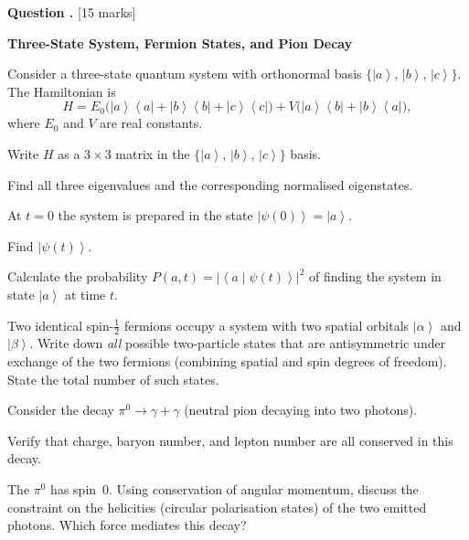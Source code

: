 \documentclass[12pt,a4paper]{article}
\newcounter{questioncounter}
\newcommand{\question}[1]{%
  \stepcounter{questioncounter}%
  \vspace{0.5cm}%
  \noindent\textbf{Question \thequestioncounter.} \hfill [#1 marks]%
  \vspace{0.2cm}%
  \par%
}
\renewcommand{\ket}[1]{\left|#1\right\rangle}
\renewcommand{\braket}[2]{\left\langle #1\middle|#2\right\rangle}
\renewcommand{\ketbra}[2]{\left|#1\right\rangle\!\left\langle #2\right|}
\begin{document}
\newpage

\question{15}

\noindent\textbf{Three-State System, Fermion States, and Pion Decay}

\begin{parts}
\item Consider a three-state quantum system with orthonormal basis $\{\ket{a},\,\ket{b},\,\ket{c}\}$. The Hamiltonian is
\[
H = E_0\bigl(\ketbra{a}{a} + \ketbra{b}{b} + \ketbra{c}{c}\bigr) + V\bigl(\ketbra{a}{b} + \ketbra{b}{a}\bigr),
\]
where $E_0$ and $V$ are real constants.
\begin{parts}
\item Write $H$ as a $3\times 3$ matrix in the $\{\ket{a},\,\ket{b},\,\ket{c}\}$ basis. 
\item Find all three eigenvalues and the corresponding normalised eigenstates. 
\end{parts}

\item At $t = 0$ the system is prepared in the state $\ket{\psi(0)} = \ket{a}$.
\begin{parts}
\item Find $\ket{\psi(t)}$. 
\item Calculate the probability $P(a,t) = |\braket{a}{\psi(t)}|^2$ of finding the system in state $\ket{a}$ at time $t$. 
\end{parts}

\item Two identical spin-$\frac{1}{2}$ fermions occupy a system with two spatial orbitals $\ket{\alpha}$ and $\ket{\beta}$. Write down \emph{all} possible two-particle states that are antisymmetric under exchange of the two fermions (combining spatial and spin degrees of freedom). State the total number of such states. 

\item Consider the decay $\pi^0 \to \gamma + \gamma$ (neutral pion decaying into two photons).
\begin{parts}
\item Verify that charge, baryon number, and lepton number are all conserved in this decay. 
\item The $\pi^0$ has spin~0. Using conservation of angular momentum, discuss the constraint on the helicities (circular polarisation states) of the two emitted photons. Which force mediates this decay? 
\end{parts}
\end{parts}

\newpage


\end{document}
